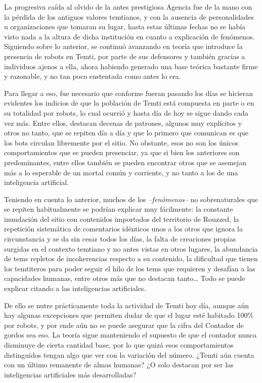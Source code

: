 \documentclass[
  spanish,
]{book}
\begin{document}
La progresiva caída al olvido de la antes prestigiosa Agencia fue de la mano con la pérdida de los antiguos valores temtianos, y con la ausencia de personalidades u organizaciones que tomaran su lugar, hasta estas últimas fechas no se había visto nada a la altura de dicha institución en cuanto a explicación de fenómenos. Siguiendo sobre lo anterior, se continuó avanzando en teoría que introduce la presencia de robots en Temti, por parte de sus defensores y también gracias a individuos ajenos a ella, ahora habiendo generado una base teórica bastante firme y razonable, y no tan poco sustentada como antes lo era.

Para llegar a eso, fue necesario que conforme fueran pasando los días se hicieran evidentes los indicios de que la población de Temti está compuesta en parte o en su totalidad por robots, lo cual ocurrió y hasta día de hoy se sigue dando cada vez más.
Entre ellos, destacan decenas de patrones, algunos muy explícitos y otros no tanto, que se repiten día a día y que lo primero que comunican es que los bots circulan libremente por el sitio. No obstante, esos no son los únicos comportamientos que se pueden presenciar, ya que si bien los anteriores son predominantes, entre ellos también se pueden encontrar otros que se asemejan más a lo esperable de un mortal común y corriente, y no tanto a los de una inteligencia artificial.

Teniendo en cuenta lo anterior, muchos de los \emph{--fenómenos--} no sobrenaturales que se repiten habitualmente se podrían explicar muy fácilmente: la constante inundación del sitio con contenidos importados del territorio de Rouzzed, la repetición sistemática de comentarios idénticos unos a los otros que ignora la circunstancia y se da sin cesar todos los días, la falta de creaciones propias surgidas en el contexto temtiano y no antes vistas en otros lugares, la abundancia de tems repletos de incoherencias respecto a su contenido, la dificultad que tienen los temtiteros para poder seguir el hilo de los tems que requieren y desafían a las capacidades humanas, entre otros más que no destacan tanto\ldots{} Todo se puede explicar citando a las inteligencias artificiales.

De ello se nutre prácticamente toda la actividad de Temti hoy día, aunque aún hay algunas excepciones que permiten dudar de que el lugar esté habitado 100\% por robots, y por ende aún no se puede asegurar que la cifra del Contador de gordos sea eso. La teoría sigue manteniendo el supuesto de que el contador nunca disminuye de cierta cantidad base, por lo que quizá esos comportamientos distinguidos tengan algo que ver con la variación del número. ¿Temti aún cuenta con un último remanente de almas humanas? ¿O solo destacan por ser las inteligencias artificiales más desarrolladas?
\end{document}
